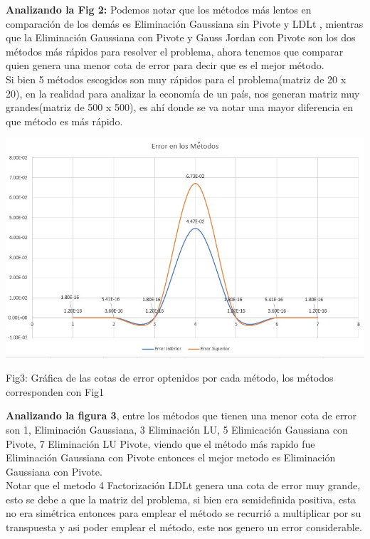 \documentclass[10pt,a4paper]{article}
\begin{document}
\begin{multicols}{2}
\noindent \textbf{Analizando la Fig 2:} 
Podemos notar que los métodos más lentos en comparación de los demás es Eliminación Gaussiana sin Pivote y LDLt , mientras que la Eliminación Gaussiana con Pivote y Gauss Jordan con Pivote son los dos métodos más rápidos para resolver el problema, ahora tenemos que comparar quien genera una menor cota de error para decir que es el mejor método.\\
\noindent Si bien 5 métodos escogidos son muy rápidos para el problema(matriz de 20 x 20), en la realidad para analizar la economía de un país, nos generan matriz muy grandes(matriz de 500 x 500), es ahí donde se va notar una mayor diferencia en que método es más rápido.
\end{multicols}

\begin{center}
	\centering
\includegraphics[scale=0.8]{Errorenlosmetodos.jpg}
	
	Fig3: Gráfica de las cotas de error optenidos por cada método, los métodos corresponden con Fig1
\end{center}
\begin{multicols}{2}
\noindent \textbf{Analizando la figura 3}, entre los métodos que tienen una menor cota de error son 1, Eliminación Gaussiana, 3 Eliminación LU, 5 Elimicación Gaussiana con Pivote, 7 Eliminación LU Pivote, viendo que el método más rapido fue Eliminación Gaussiana con Pivote entonces el mejor metodo es Eliminación Gaussiana con Pivote.\\
\noindent Notar que el metodo 4 Factorización LDLt genera una cota de error muy grande, esto se debe a que la matriz del problema, si bien era semidefinida positiva, esta no era simétrica entonces para emplear el método se recurrió a multiplicar por su transpuesta y asi poder emplear el método, este nos genero un error considerable.\\
\end{multicols}
\end{document}
